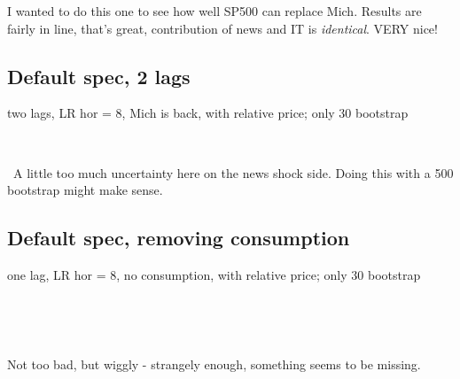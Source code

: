 \documentclass{article}
\def \ourFigPath {../../}
\begin{document}
I wanted to do this one to see how well SP500 can replace Mich. Results are fairly in line, that's great, contribution of news and IT is \emph{identical}. VERY nice!
\newpage
	\subsection{Default spec, 2 lags}
	\noindent two lags, LR hor = 8, Mich is back, with relative price; only 30 bootstrap
	
	\
	
	
	
	
	\begin{figure}[h!]
\centering
{} \hspace{.2in%
} 
\end{figure}

\
A little too much uncertainty here on the news shock side. Doing this with a 500 bootstrap might make sense. %



\newpage
	\subsection{Default spec, removing consumption}
	\noindent one lag, LR hor = 8, no consumption, with relative price; only 30 bootstrap
	
	\
	
	
	
	
	\begin{figure}[h!]
\centering
{} \hspace{.2in%
} 
\end{figure}

\

Not too bad, but wiggly - strangely enough, something seems to be missing.
\end{document}
